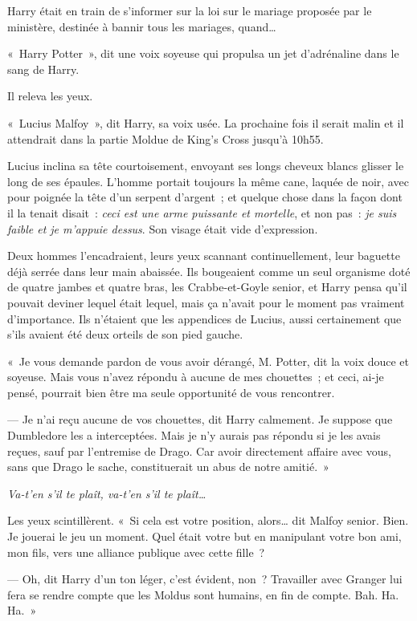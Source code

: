 Harry était en train de s'informer sur la loi sur le mariage proposée par le ministère, destinée à bannir tous les mariages, quand…

«~Harry Potter~», dit une voix soyeuse qui propulsa un jet d'adrénaline dans le sang de Harry.

Il releva les yeux.

«~Lucius Malfoy~», dit Harry, sa voix usée.
La prochaine fois il serait malin et il attendrait dans la partie Moldue de King's Cross jusqu'à 10h55.

Lucius inclina sa tête courtoisement, envoyant ses longs cheveux blancs glisser le long de ses épaules.
L'homme portait toujours la même cane, laquée de noir, avec pour poignée la tête d'un serpent d'argent~; et quelque chose dans la façon dont il la tenait disait~: \emph{ceci est une arme puissante et mortelle}, et non pas~: \emph{je suis faible et je m'appuie dessus}.
Son visage était vide d'expression.

Deux hommes l'encadraient, leurs yeux scannant continuellement, leur baguette déjà serrée dans leur main abaissée.
Ils bougeaient comme un seul organisme doté de quatre jambes et quatre bras, les Crabbe-et-Goyle senior, et Harry pensa qu'il pouvait deviner lequel était lequel, mais ça n'avait pour le moment pas vraiment d'importance.
Ils n'étaient que les appendices de Lucius, aussi certainement que s'ils avaient été deux orteils de son pied gauche.

«~Je vous demande pardon de vous avoir dérangé, M. Potter, dit la voix douce et soyeuse.
Mais vous n'avez répondu à aucune de mes chouettes~; et ceci, ai-je pensé, pourrait bien être ma seule opportunité de vous rencontrer.

--- Je n'ai reçu aucune de vos chouettes, dit Harry calmement.
Je suppose que Dumbledore les a interceptées.
Mais je n'y aurais pas répondu si je les avais reçues, sauf par l'entremise de Drago.
Car avoir directement affaire avec vous, sans que Drago le sache, constituerait un abus de notre amitié.~»

\emph{Va-t'en s'il te plaît, va-t'en s'il te plaît…}

Les yeux scintillèrent.
«~Si cela est votre position, alors… dit Malfoy senior.
Bien. Je jouerai le jeu un moment.
Quel était votre but en manipulant votre bon ami, mon fils, vers une alliance publique avec cette fille~?

--- Oh, dit Harry d'un ton léger, c'est évident, non~?
Travailler avec Granger lui fera se rendre compte que les Moldus sont humains, en fin de compte.
Bah. Ha.
Ha.~»


